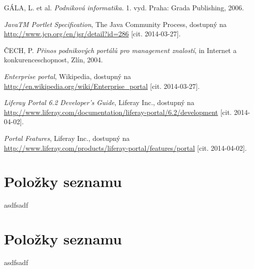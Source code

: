 \documentclass{fithesis}
\begin{document}

\begin{thebibliography}{0}

GÁLA, L. et al. \textit{Podniková informatika}. 1. vyd. Praha: Grada Publishing, 2006. 

\textit{JavaTM Portlet Specification}, The Java Community Process, dostupný na \url{http://www.jcp.org/en/jsr/detail?id=286} [cit. 2014-03-27].

ČECH, P. \textit {Přinos podnikových portálů pro management znalostí}, in Internet a konkurenceschopnost, Zlín, 2004.

\textit{Enterprise portal}, Wikipedia, dostupný na \url{http://en.wikipedia.org/wiki/Enterprise_portal} [cit. 2014-03-27].

\textit{Liferay Portal 6.2 Developer's Guide}, Liferay Inc., dostupný na \url{http://www.liferay.com/documentation/liferay-portal/6.2/development} [cit. 2014-04-02].

\textit{Portal Features}, Liferay Inc., dostupný na \url{http://www.liferay.com/products/liferay-portal/features/portal} [cit. 2014-04-02].






\end{thebibliography}


\newpage
\appendix
\chapter{Položky seznamu}
asdfsadf

\chapter{Položky seznamu}
asdfsadf
\end{document}
